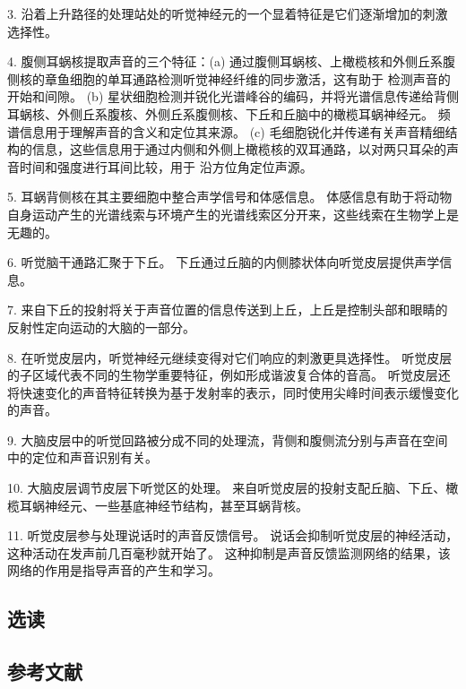 3. 沿着上升路径的处理站处的听觉神经元的一个显着特征是它们逐渐增加的刺激选择性。 

4. 腹侧耳蜗核提取声音的三个特征：(a) 通过腹侧耳蜗核、上橄榄核和外侧丘系腹侧核的章鱼细胞的单耳通路检测听觉神经纤维的同步激活，这有助于 检测声音的开始和间隙。 (b) 星状细胞检测并锐化光谱峰谷的编码，并将光谱信息传递给背侧耳蜗核、外侧丘系腹核、外侧丘系腹侧核、下丘和丘脑中的橄榄耳蜗神经元。 频谱信息用于理解声音的含义和定位其来源。 (c) 毛细胞锐化并传递有关声音精细结构的信息，这些信息用于通过内侧和外侧上橄榄核的双耳通路，以对两只耳朵的声音时间和强度进行耳间比较，用于 沿方位角定位声源。 

5. 耳蜗背侧核在其主要细胞中整合声学信号和体感信息。 体感信息有助于将动物自身运动产生的光谱线索与环境产生的光谱线索区分开来，这些线索在生物学上是无趣的。 

6. 听觉脑干通路汇聚于下丘。 下丘通过丘脑的内侧膝状体向听觉皮层提供声学信息。 

7. 来自下丘的投射将关于声音位置的信息传送到上丘，上丘是控制头部和眼睛的反射性定向运动的大脑的一部分。 

8. 在听觉皮层内，听觉神经元继续变得对它们响应的刺激更具选择性。 听觉皮层的子区域代表不同的生物学重要特征，例如形成谐波复合体的音高。 听觉皮层还将快速变化的声音特征转换为基于发射率的表示，同时使用尖峰时间表示缓慢变化的声音。 

9. 大脑皮层中的听觉回路被分成不同的处理流，背侧和腹侧流分别与声音在空间中的定位和声音识别有关。 

10. 大脑皮层调节皮层下听觉区的处理。 来自听觉皮层的投射支配丘脑、下丘、橄榄耳蜗神经元、一些基底神经节结构，甚至耳蜗背核。 

11. 听觉皮层参与处理说话时的声音反馈信号。 说话会抑制听觉皮层的神经活动，这种活动在发声前几百毫秒就开始了。 这种抑制是声音反馈监测网络的结果，该网络的作用是指导声音的产生和学习。


\subsection{选读}
\subsection{参考文献}
